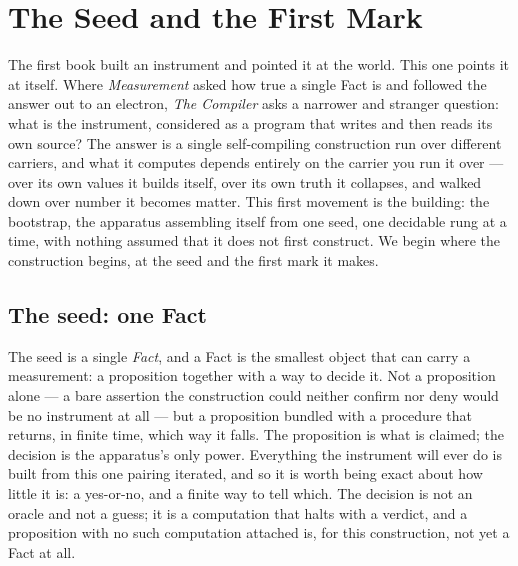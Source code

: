 \chapter{The Seed and the First Mark}
\label{chap:seed-first-mark}

The first book built an instrument and pointed it at the world. This one points it at itself. Where
\emph{Measurement} asked how true a single Fact is and followed the answer out to an electron, \emph{The
Compiler} asks a narrower and stranger question: what is the instrument, considered as a program that
writes and then reads its own source? The answer is a single self-compiling construction run over
different carriers, and what it computes depends entirely on the carrier you run it over --- over its own
values it builds itself, over its own truth it collapses, and walked down over number it becomes matter.
This first movement is the building: the bootstrap, the apparatus assembling itself from one seed, one
decidable rung at a time, with nothing assumed that it does not first construct. We begin where the
construction begins, at the seed and the first mark it makes.

\section{The seed: one Fact}
\label{se:the-seed-one-fact}

The seed is a single \emph{Fact}, and a Fact is the smallest object that can carry a measurement: a
proposition together with a way to decide it. Not a proposition alone --- a bare assertion the
construction could neither confirm nor deny would be no instrument at all --- but a proposition bundled
with a procedure that returns, in finite time, which way it falls. The proposition is what is claimed; the
decision is the apparatus's only power. Everything the instrument will ever do is built from this one
pairing iterated, and so it is worth being exact about how little it is: a yes-or-no, and a finite way to
tell which. The decision is not an oracle and not a guess; it is a computation that halts with a verdict,
and a proposition with no such computation attached is, for this construction, not yet a Fact at all.

